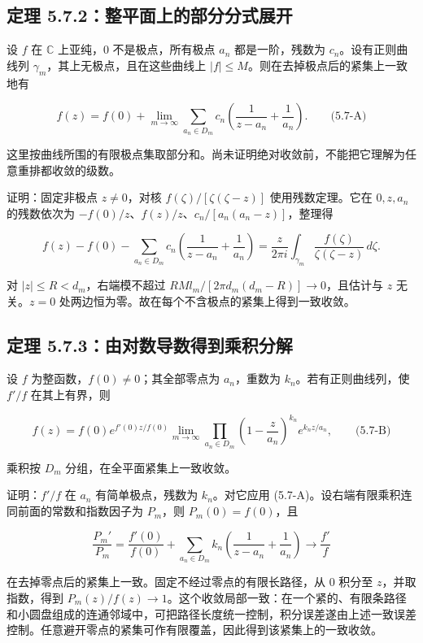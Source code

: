 \documentclass[11pt,a4paper]{article}
\begin{document}
\subsection{定理 5.7.2：整平面上的部分分式展开}\label{ch05-s7-heading-2}

设 \(f\) 在 \(\mathbb C\) 上亚纯，\(0\) 不是极点，所有极点 \(a_n\)
都是一阶，残数为 \(c_n\)。设有正则曲线列
\(\gamma_m\)，其上无极点，且在这些曲线上
\(|f|\le M\)。则在去掉极点后的紧集上一致地有

\[
f(z)=f(0)+\lim_{m\to\infty}\sum_{a_n\in D_m}
 c_n\left(\frac1{z-a_n}+\frac1{a_n}\right).
\qquad\text{(5.7-A)}
\]

这里按曲线所围的有限极点集取部分和。尚未证明绝对收敛前，不能把它理解为任意重排都收敛的级数。

证明：固定非极点 \(z\ne0\)，对核 \(f(\zeta)/[\zeta(\zeta-z)]\)
使用残数定理。它在 \(0,z,a_n\) 的残数依次为
\(-f(0)/z\)、\(f(z)/z\)、\(c_n/[a_n(a_n-z)]\)，整理得

\[
f(z)-f(0)-\sum_{a_n\in D_m}c_n\left(\frac1{z-a_n}+\frac1{a_n}\right)
=\frac z{2\pi i}\int_{\gamma_m}\frac{f(\zeta)}{\zeta(\zeta-z)}\,d\zeta.
\]

对 \(|z|\le R<d_m\)，右端模不超过
\(RMl_m/[2\pi d_m(d_m-R)]\to0\)，且估计与 \(z\) 无关。\(z=0\)
处两边恒为零。故在每个不含极点的紧集上得到一致收敛。

\subsection{定理 5.7.3：由对数导数得到乘积分解}\label{ch05-s7-heading-3}

设 \(f\) 为整函数，\(f(0)\ne0\)；其全部零点为 \(a_n\)，重数为
\(k_n\)。若有正则曲线列，使 \(f'/f\) 在其上有界，则

\[
f(z)=f(0)e^{f'(0)z/f(0)}
\lim_{m\to\infty}\prod_{a_n\in D_m}
\left(1-\frac z{a_n}\right)^{k_n}e^{k_nz/a_n},
\qquad\text{(5.7-B)}
\]

乘积按 \(D_m\) 分组，在全平面紧集上一致收敛。

证明：\(f'/f\) 在 \(a_n\) 有简单极点，残数为 \(k_n\)。对它应用
(5.7-A)。设右端有限乘积连同前面的常数和指数因子为 \(P_m\)，则
\(P_m(0)=f(0)\)，且

\[
\frac{P_m'}{P_m}
=\frac{f'(0)}{f(0)}+\sum_{a_n\in D_m}k_n
\left(\frac1{z-a_n}+\frac1{a_n}\right)
\longrightarrow\frac{f'}f
\]

在去掉零点后的紧集上一致。固定不经过零点的有限长路径，从 \(0\) 积分至
\(z\)，并取指数，得到
\(P_m(z)/f(z)\to1\)。这个收敛局部一致：在一个紧的、有限条路径和小圆盘组成的连通邻域中，可把路径长度统一控制，积分误差遂由上述一致误差控制。任意避开零点的紧集可作有限覆盖，因此得到该紧集上的一致收敛。
\end{document}
